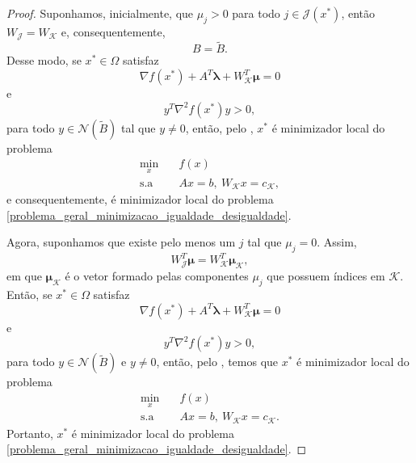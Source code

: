 \documentclass[12pt,a4paper]{scrartcl}
\def\RR{\mathds{R}}
\theoremstyle{definition}%
\newtheorem{defi}{Definição}
\begin{document}
\begin{proof}
Suponhamos, inicialmente, que $\mu_{j} >0$ para todo $j\in \mathcal{J}(x^{*})$, então $W_{\mathcal{J}} = W_{\mathcal{K}}$ e, consequentemente, 
\[
B = \tilde{B} .
\]
Desse modo, se $x^{*} \in \Omega$ satisfaz
\[
\nabla f(x^{*}) + A^{T}\boldsymbol{\lambda} + W^{T}_{\mathcal{K}} \boldsymbol{\mu} =0
\]
e
\[
y^{T}\nabla^{2} f(x^{*})y >0,
\]
para todo $y\in \mathcal{N}(\tilde{B})$ tal que $y\neq 0$, então, pelo , $x^{*}$ é minimizador local do problema
\[ 
\begin{aligned}
\min_{x} & \quad f(x) \\
\text{s.a} & \quad Ax=b, \ W_{\mathcal{K}}x=c_{\mathcal{K}} ,
\end{aligned}
\]
e consequentemente, é minimizador local do problema \eqref{problema_geral_minimizacao_igualdade_desigualdade}.

Agora, suponhamos que existe pelo menos um $j$ tal que $\mu_{j} =0$. Assim, 
\[
W_{\mathcal{J}}^{T}\boldsymbol{\mu} = W_{\mathcal{K}}^{T}\boldsymbol{\mu}_{\mathcal{K}} ,
\]
em que $\boldsymbol{\mu}_{\mathcal{K}}$ é o vetor formado pelas componentes $\mu_{j}$ que possuem índices em $\mathcal{K}$. Então, se $x^{*} \in \Omega$ satisfaz
\[
\nabla f(x^{*}) + A^{T}\boldsymbol{\lambda} + W^{T}_{\mathcal{K}} \boldsymbol{\mu} =0
\]
e
\[
y^{T}\nabla^{2} f(x^{*})y >0,
\]
para todo $y\in \mathcal{N}(\tilde{B})$ e $y\neq 0$, então, pelo , temos que $x^{*}$ é minimizador local do problema
\[ 
\begin{aligned}
\min_{x} & \quad f(x) \\
\text{s.a} & \quad Ax=b, \ W_{\mathcal{K}}x=c_{\mathcal{K}} .
\end{aligned}
\]
Portanto, $x^{*}$ é minimizador local do problema \eqref{problema_geral_minimizacao_igualdade_desigualdade}.
\end{proof}



\end{document}
